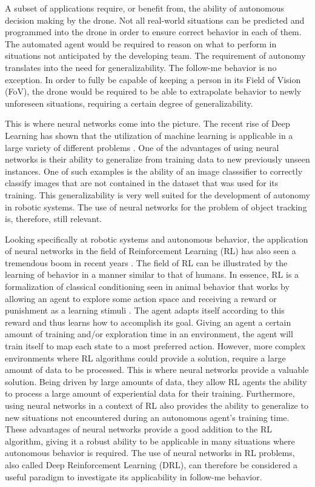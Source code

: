A subset of applications require, or benefit from, the ability of 
autonomous decision making by the drone. Not all real-world situations can be predicted and 
programmed into the drone in order to ensure correct behavior in each of them. The automated 
agent would be required to reason on what to perform in situations not anticipated by 
the developing team. The requirement of autonomy translates into the need 
for generalizability. The follow-me behavior is no exception. In order to fully 
be capable of keeping a person in its Field of Vision (FoV), the drone would be required 
to be able to extrapolate behavior to newly unforeseen situations, requiring a certain 
degree of generalizability.

This is where neural networks come into the picture. The recent rise of Deep Learning 
has shown that the utilization of machine learning is applicable in a large variety 
of different problems \cite{riseofneuralnets}. One of the advantages of using neural networks
is their ability to generalize from training data to new previously unseen instances.
One of such examples is the ability of an image classsifier to correctly classify images 
that are not contained in the dataset that was used for its training. This 
generalizability is very well suited for the development of autonomy in robotic systems. 
The use of neural networks for the problem of object tracking is, therefore, still relevant.

Looking specifically at robotic systems and autonomous behavior, the application of neural 
networks in the field of Reinforcement Learning (RL) has also seen a tremendous boom in 
recent years \cite{riseofrl}. The field of RL can be illustrated by the learning of behavior 
in a manner similar to that of humans. In essence, RL is a formalization of classical 
conditioning seen in animal behavior that works by allowing an agent to explore 
some action space and receiving a reward or punishment as a learning stimuli \cite{RLBook}. 
The agent adapts itself according to this reward and thus learns how to accomplish its goal. 
Giving an agent a certain amount of training and/or exploration time in an environment, 
the agent will train itself to map each state to a most preferred action. However, more 
complex environments where RL algorithms 
could provide a solution, require a large amount of data to be processed. This is where 
neural networks provide a valuable solution. Being driven by large amounts of data,
they allow RL agents the ability to process a large 
amount of experiential data for their training. Furthermore, using neural networks in a 
context of RL also provides the ability to generalize to new situations not encountered 
during an autonomous agent's training time. 
These advantages of neural networks provide a good addition to the RL algorithm, giving it 
a robust ability to be applicable in many situations where autonomous behavior is required.
The use of neural networks in RL problems, also called Deep Reinforcement Learning (DRL), can 
therefore be considered a useful paradigm to investigate its applicability in follow-me behavior. 

